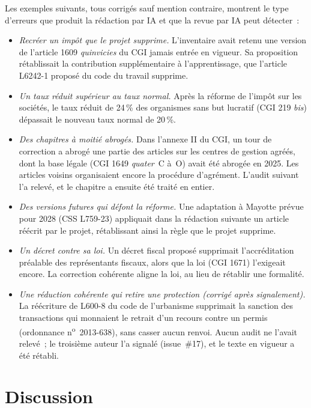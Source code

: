 \documentclass[11pt,a4paper]{article}
\begin{document}
Les exemples suivants, tous corrigés sauf mention contraire, montrent le type d'erreurs que produit la rédaction par IA et que la revue par IA peut détecter~:
\begin{itemize}
  \item \emph{Recréer un impôt que le projet supprime.} L'inventaire avait retenu une version de l'article 1609 \emph{quinvicies} du CGI jamais entrée en vigueur. Sa proposition rétablissait la contribution supplémentaire à l'apprentissage, que l'article L6242-1 proposé du code du travail supprime.
  \item \emph{Un taux \og réduit \fg{} supérieur au taux normal.} Après la réforme de l'impôt sur les sociétés, le taux réduit de 24\,\% des organismes sans but lucratif (CGI 219 \emph{bis}) dépassait le nouveau taux normal de 20\,\%.
  \item \emph{Des chapitres à moitié abrogés.} Dans l'annexe II du CGI, un tour de correction a abrogé une partie des articles sur les centres de gestion agréés, dont la base légale (CGI 1649 \emph{quater}~C à~O) avait été abrogée en 2025. Les articles voisins organisaient encore la procédure d'agrément. L'audit suivant l'a relevé, et le chapitre a ensuite été traité en entier.
  \item \emph{Des versions futures qui défont la réforme.} Une adaptation à Mayotte prévue pour 2028 (CSS L759-23) appliquait \og dans la rédaction suivante \fg{} un article réécrit par le projet, rétablissant ainsi la règle que le projet supprime.
  \item \emph{Un décret contre sa loi.} Un décret fiscal proposé supprimait l'accréditation préalable des représentants fiscaux, alors que la loi (CGI 1671) l'exigeait encore. La correction cohérente aligne la loi, au lieu de rétablir une formalité.
  \item \emph{Une réduction cohérente qui retire une protection (corrigé après signalement).} La réécriture de L600-8 du code de l'urbanisme supprimait la sanction des transactions qui monnaient le retrait d'un recours contre un permis (ordonnance n\textsuperscript{o}~2013-638), sans casser aucun renvoi. Aucun audit ne l'avait relevé~; le troisième auteur l'a signalé (issue~\#17), et le texte en vigueur a été rétabli.
\end{itemize}

\section{Discussion}
\label{fr:sec:discussion}
\end{document}
